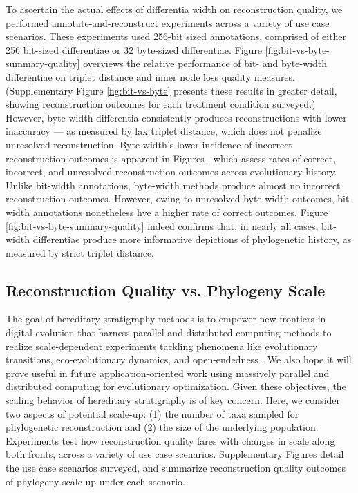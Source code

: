 To ascertain the actual effects of differentia width on reconstruction quality, we performed annotate-and-reconstruct experiments across a variety of use case scenarios.
These experiments used 256-bit sized annotations, comprised of either 256 bit-sized differentiae or 32 byte-sized differentiae.
Figure \ref{fig:bit-vs-byte-summary-quality} overviews the relative performance of bit- and byte-width differentiae on triplet distance and inner node loss quality measures.
(Supplementary Figure \ref{fig:bit-vs-byte} presents these results in greater detail, showing reconstruction outcomes for each treatment condition surveyed.)
However, byte-width differentia consistently produces reconstructions with lower inaccuracy --- as measured by lax triplet distance, which does not penalize unresolved reconstruction.
Byte-width's lower incidence of incorrect reconstruction outcomes is apparent in Figures , which assess rates of correct, incorrect, and unresolved reconstruction outcomes across evolutionary history.
Unlike bit-width annotations, byte-width methods produce almost no incorrect reconstruction outcomes.
However, owing to unresolved byte-width outcomes, bit-width annotations nonetheless hve a higher rate of correct outcomes.
Figure \ref{fig:bit-vs-byte-summary-quality} indeed confirms that, in nearly all cases, bit-width differentiae produce more informative depictions of phylogenetic history, as measured by strict triplet distance.

\subsection{Reconstruction Quality vs. Phylogeny Scale} \label{sec:scaling}


The goal of hereditary stratigraphy methods is to empower new frontiers in digital evolution that harness parallel and distributed computing methods to realize scale-dependent experiments tackling phenomena like evolutionary transitions, eco-evolutionary dynamics, and open-endedness \citep{moreno2022exploring,dolsonECOLOGYREVIEW,channon2019TODO}.
We also hope it will prove useful in future application-oriented work using massively parallel and distributed computing for evolutionary optimization.
Given these objectives, the scaling behavior of hereditary stratigraphy is of key concern.
Here, we consider two aspects of potential scale-up: (1) the number of taxa sampled for phylogenetic reconstruction and (2) the size of the underlying population.
Experiments test how reconstruction quality fares with changes in scale along both fronts, across a variety of use case scenarios.
Supplementary Figures  detail the use case scenarios surveyed, and summarize reconstruction quality outcomes of phylogeny scale-up under each scenario.

